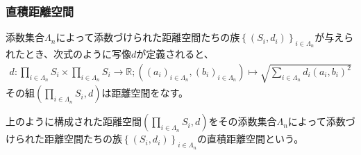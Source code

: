 \documentclass[dvipdfmx]{jsarticle}
\begin{document}
\subsubsection{直積距離空間}%
\begin{thm}\label{8.2.1.19}
添数集合$\varLambda_{n}$によって添数づけられた距離空間たちの族$\left\{ \left( S_{i},d_{i} \right) \right\}_{i \in \varLambda_{n}}$が与えられたとき、次式のように写像$d$が定義されると、
\begin{align*}
d:\prod_{i \in \varLambda_{n}} S_{i} \times \prod_{i \in \varLambda_{n}} S_{i} \rightarrow \mathbb{R};\left( \left( a_{i} \right)_{i \in \varLambda_{n}},\left( b_{i} \right)_{i \in \varLambda_{n}} \right) \mapsto \sqrt{\sum_{i \in \varLambda_{n}} {d_{i}\left( a_{i},b_{i} \right)}^{2}}
\end{align*}
その組$\left( \prod_{i \in \varLambda_{n}} S_{i},d \right)$は距離空間をなす。
\end{thm}
\begin{dfn}
上のように構成された距離空間$\left( \prod_{i \in \varLambda_{n}} S_{i},d \right)$をその添数集合$\varLambda_{n}$によって添数づけられた距離空間たちの族$\left\{ \left( S_{i},d_{i} \right) \right\}_{i \in \varLambda_{n}}$の直積距離空間という。
\end{dfn}
\end{document}
